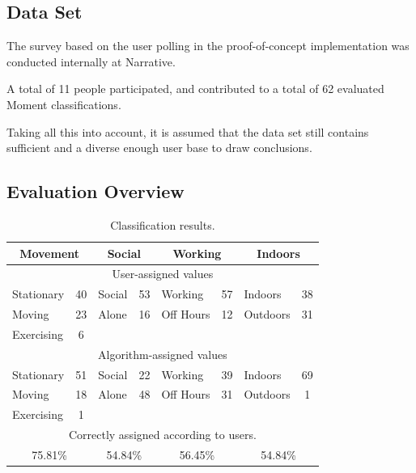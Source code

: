 \subsection{Data Set}
The survey based on the user polling in the proof-of-concept implementation
was conducted internally at Narrative.

A total of 11 people participated, and contributed to a total of 62 evaluated
Moment classifications. 

Taking all this into account, it is assumed that the data set still contains 
sufficient and a diverse enough user base to draw conclusions. 

\subsection{Evaluation Overview}

\begin{table}
    \centering
    {\begin{tabular}{ | l | c | l | c | l | c | l | c |}
        \hline
            \multicolumn{2}{|c|}{Movement} &
            \multicolumn{2}{|c|}{Social}   &
            \multicolumn{2}{|c|}{Working}  &
            \multicolumn{2}{|c|}{Indoors} \\
        \hline
            \multicolumn{8}{|c|}{User-assigned values} \\
        \hline
        Stationary  & 40 & Social & 53 & Working    & 57 & Indoors  & 38 \\
        Moving      & 23 & Alone  & 16 & Off Hours  & 12 & Outdoors & 31 \\
        Exercising  &  6 &        &    &            &    &          &    \\
        \hline
            \multicolumn{8}{|c|}{Algorithm-assigned values} \\
        \hline
        Stationary  & 51 & Social & 22 & Working    & 39 & Indoors  & 69 \\
        Moving      & 18 & Alone  & 48 & Off Hours  & 31 & Outdoors & 1 \\
        Exercising  &  1 &        &    &            &    &          &    \\
        \hline
            \multicolumn{8}{|c|}{Correctly assigned according to users.} \\
        \hline
            \multicolumn{2}{|c|}{75.81\%} &
            \multicolumn{2}{|c|}{54.84\%} &
            \multicolumn{2}{|c|}{56.45\%} &
            \multicolumn{2}{|c|}{54.84\%} \\
        \hline
    \end{tabular}}
    \caption{Classification results.} 
    \label{table:classification-values}
\end{table}

